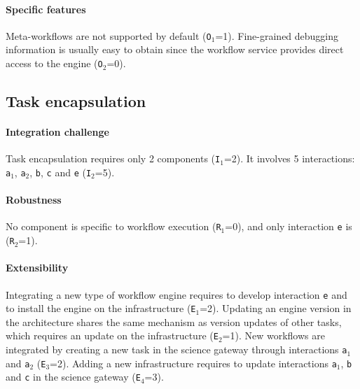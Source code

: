 \documentclass[preprint,3p,twocolumn]{elsarticle}
\newcommand{\closedanswerednote}[6]{}
\begin{document}
\paragraph{Specific features} Meta-workflows are not supported by default
(\texttt{O$_1$}=1). Fine-grained debugging information is usually easy
to obtain since the workflow service provides direct access to the
engine (\texttt{O$_2$}=0).

\subsection{Task encapsulation}

\paragraph{Integration challenge} Task encapsulation requires only 2
components (\texttt{I$_1$}=2).  It involves 5 interactions:
\texttt{a$_1$}, \texttt{a$_2$}, \texttt{b}, \texttt{c} and
\texttt{e} (\texttt{I$_2$}=5).

\paragraph{Robustness} No component is specific to workflow execution
(\texttt{R$_1$}=0), and only interaction \texttt{e} is
(\texttt{R$_2$}=1)\closedanswerednote{sorina}{I understand why this is 1
  (and why interactions c and b are not counted here), but I wonder
  whether we can simply ignore these interactions because they are not
  specific to workflow execution. As far as robustness is concerned,
  the transfers have to be successful anyway...}{Tristan}{We cannot
  just ignore these interactions in the architecture because they are
  required for the system to work. The transfers have to be successful
  but data movements in the workflow will use the same code as data
  movements done in the science gateway, which will make this
  architecture more robust than service for instance. In VIP, for
  instance, the code used in the GASW wrapper to transfer data (c2) is
  completely independent from the ``file transfer'' module in the
  platform (c1), which is detrimental to robustness}{Tristan}{Closed,
  see github issue \#7.}.

\paragraph{Extensibility} Integrating a new type of workflow engine
requires to develop interaction \texttt{e} and to install the engine
on the infrastructure (\texttt{E$_1$}=2). Updating an engine version
in the architecture shares the same mechanism as version updates of
other tasks, which requires an update on the
infrastructure (\texttt{E$_2$}=1).  New workflows are integrated by
creating a new task in the science gateway through interactions
\texttt{a$_1$} and \texttt{a$_2$} (\texttt{E$_3$}=2). Adding a new
infrastructure requires to update interactions \texttt{a$_1$},
\texttt{b} and \texttt{c} in the science gateway (\texttt{E$_4$}=3).
\end{document}
